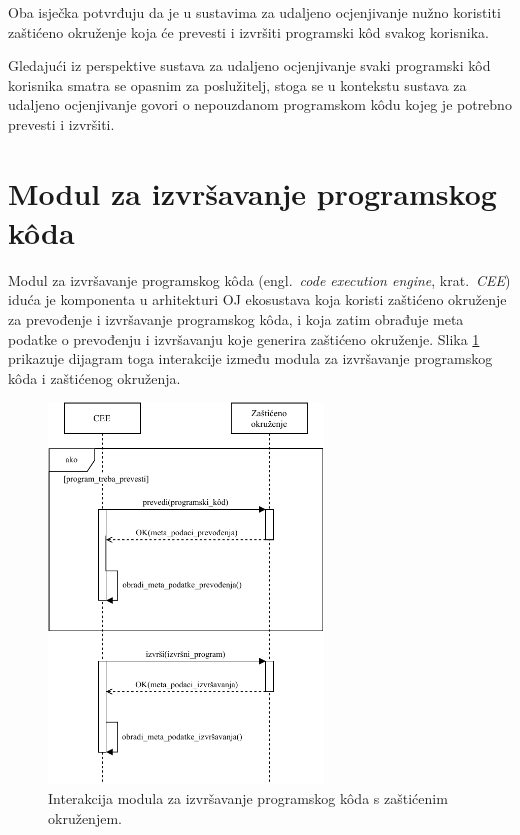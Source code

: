 \documentclass[times, utf8, diplomski]{fer}
\begin{document}
Oba isječka potvrđuju da je u sustavima za udaljeno ocjenjivanje nužno koristiti zaštićeno okruženje koja će prevesti i izvršiti programski kôd svakog korisnika. 

Gledajući iz perspektive sustava za udaljeno ocjenjivanje svaki programski kôd korisnika smatra se opasnim za poslužitelj, stoga se u kontekstu sustava za udaljeno ocjenjivanje govori o nepouzdanom programskom kôdu  kojeg je potrebno prevesti i izvršiti.

\section{Modul za izvršavanje programskog kôda}
Modul za izvršavanje programskog kôda (engl.\ \textit{code execution engine}, krat.\ \textit{CEE}) iduća je komponenta u arhitekturi OJ ekosustava koja koristi zaštićeno okruženje za prevođenje i izvršavanje programskog kôda, i koja zatim obrađuje meta podatke o prevođenju i izvršavanju koje generira zaštićeno okruženje. Slika \ref{fig:cee-and-sandbox} prikazuje dijagram toga interakcije između modula za izvršavanje programskog kôda i zaštićenog okruženja.

\begin{figure}[htb]
	\centering
	\includegraphics[width=0.65\textwidth]{images/CEE i zaštićeno okruženje.pdf}
	\caption{
		Interakcija modula za izvršavanje programskog kôda s zaštićenim okruženjem.
	}
	\label{fig:cee-and-sandbox}
\end{figure}
\end{document}
